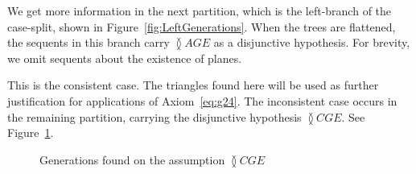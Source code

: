We get more information in the next partition, which is the left-branch of the case-split, shown in Figure~\ref{fig:LeftGenerations}. When the trees are flattened, the sequents in this branch carry $\between{A}{G}{E}$ as a disjunctive hypothesis. For brevity, we omit sequents about the existence of planes.

This is the consistent case. The triangles found here will be used as further justification for applications of Axiom~\ref{eq:g24}. The inconsistent case occurs in the remaining partition, carrying the disjunctive hypothesis $\between{C}{G}{E}$. See Figure~\ref{fig:RightGenerations}.

\begin{figure}[h]
\caption{Generations found on the assumption $\between{C}{G}{E}$}
\label{fig:RightGenerations}
\end{figure}

